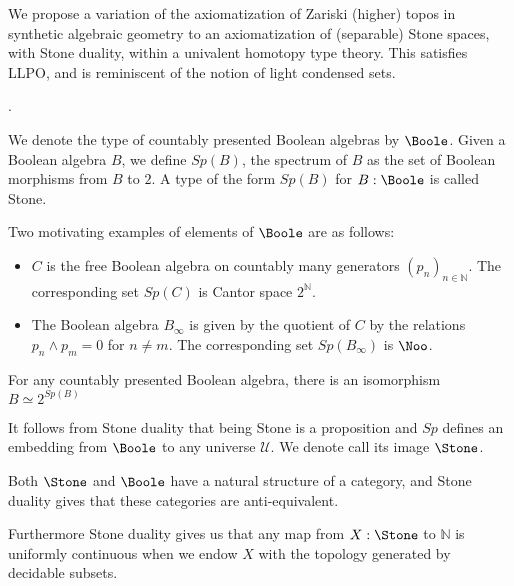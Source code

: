 We propose a variation of
the axiomatization of Zariski (higher) topos in synthetic algebraic geometry
to an axiomatization of (separable) Stone spaces, with Stone duality,
within a univalent homotopy type theory.  This satisfies LLPO, and is reminiscent
of the notion of light condensed sets.

\cite{draft}. 

\medskip

We denote the type of countably presented Boolean algebras by $\Boole$.
Given a Boolean algebra $B$, we define $Sp(B)$, the spectrum of $B$ as the set of 
Boolean morphisms from $B$ to $2$. 
 A type of the form $Sp(B)$ for $B:\Boole$ is called Stone.


 Two motivating examples of elements of $\Boole$ are as follows:
 \begin{itemize}
   \item $C$ is the free Boolean algebra on countably many generators $(p_n)_{n\in\mathbb N}$. 
     The corresponding set $Sp(C)$ is Cantor space $2^\mathbb N$. 
   \item The Boolean algebra $ B_\infty$ is given by the quotient of $C$ by the relations $p_n\wedge p_m = 0$ for $n\neq m$. 
 The corresponding set $Sp(B_\infty)$ is $\Noo$. 
  \end{itemize} 

\begin{axiom}
  For any countably presented Boolean algebra, there is an isomorphism $B \simeq 2^{Sp(B)}$
\end{axiom}
It follows from Stone duality that being Stone is a proposition and $Sp$ defines an embedding from $\Boole$ 
to any universe $\mathcal U$. We denote call its image $\Stone$. 

Both $\Stone$ and $\Boole$ have a natural structure of a category, and 
Stone duality gives that these categories are anti-equivalent. 

Furthermore Stone duality gives us that any map from $X:\Stone$ to $\mathbb N$ is uniformly continuous
when we endow $X$ with the topology generated by decidable subsets. 

